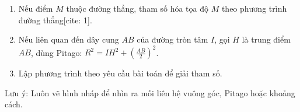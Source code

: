 \begin{enumerate}
\item Nếu điểm $M$ thuộc đường thẳng, tham số hóa tọa độ $M$ theo phương trình đường thẳng[cite: 1].
\item Nếu liên quan đến dây cung $AB$ của đường tròn tâm $I$, gọi $H$ là trung điểm $AB$, dùng Pitago: $R^2 = IH^2 + \left(\frac{AB}{2}\right)^2$.
\item Lập phương trình theo yêu cầu bài toán để giải tham số.
\end{enumerate}
Lưu ý: Luôn vẽ hình nháp để nhìn ra mối liên hệ vuông góc, Pitago hoặc khoảng cách.
